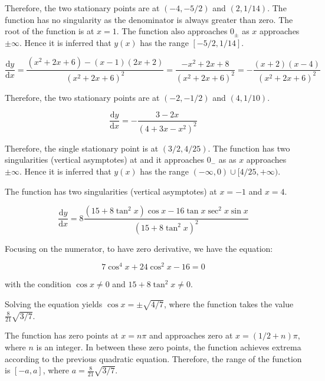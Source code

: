\documentclass[12pt]{article}
\begin{document}
Therefore, the two stationary points are at $(-4, -5/2)$ and $(2, 1/14)$. The function has no singularity as the denominator is always greater than zero. The root of the function is at $x = 1$. The function also approaches $0_{\pm}$ as $x$ approaches $\pm \infty$. Hence it is inferred that $y(x)$ has the range $\boxed{[-5/2, 1/14]}$.

\begin{correction}
    \begin{equation*}
        \frac{\mathrm{d}y}{\mathrm{d}x} = \frac{(x^{2} + 2x + 6) - (x - 1)(2x + 2)}{(x^{2} + 2x + 6)^{2}} = \frac{-x^{2} + 2x + 8}{(x^{2} + 2x + 6)^{2}} = - {\frac{(x + 2)(x - 4)}{(x^{2} + 2x + 6)^{2}}}
    \end{equation*}

    Therefore, the two stationary points are at $(-2, -1/2)$ and $(4, 1/10)$.
\end{correction}


\begin{equation}
    \frac{\mathrm{d}y}{\mathrm{d}x} = -\frac{3 - 2x}{(4 + 3x - x^{2})^{2}}
\end{equation}

Therefore, the single stationary point is at $(3/2, 4/25)$. The function has two singularities (vertical asymptotes) at  and it approaches $0_{-}$ as as $x$ approaches $\pm \infty$. Hence it is inferred that $y(x)$ has the range $\boxed{(-\infty, 0) \cup [4/25, +\infty)}$.

\begin{correction}
    The function has two singularities (vertical asymptotes) at $x = -1$ and $x = 4$.
\end{correction}


\begin{equation}
    \frac{\mathrm{d}y}{\mathrm{d}x} = 8\frac{(15 + 8\tan^{2}{x}) \cos{x} - 16\tan{x} \sec^{2}{x} \sin{x}}{(15 + 8\tan^{2}{x})^{2}}
\end{equation}

Focusing on the numerator, to have zero derivative, we have the equation:

\begin{equation}
    7\cos^{4}{x} + 24\cos^{2}{x} - 16 = 0
\end{equation}

with the condition $\cos{x} \ne 0$ and $15 + 8\tan^{2}{x} \ne 0$.

Solving the equation yields $\cos{x} = \pm \sqrt{4/7}$, where the function takes the value $\frac{8}{21} \sqrt{3/7}$.

The function has zero points at $x = n\pi$ and approaches zero at $x = (1/2 + n)\pi$, where $n$ is an integer. In between these zero points, the function achieves extrema according to the previous quadratic equation. Therefore, the range of the function is $[-a, a]$, where $a = \frac{8}{21} \sqrt{3/7}$.
\end{document}
